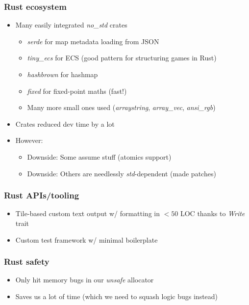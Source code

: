 \documentclass{beamer}
\begin{document}
\begin{frame}
	\frametitle{Rust ecosystem}
	\begin{itemize}
		\item Many easily integrated \emph{no\_std} crates
		      \begin{itemize}
			      \item \emph{serde} for map metadata loading from JSON
			      \item \emph{tiny\_ecs} for ECS (good pattern for structuring games in Rust)
			      \item \emph{hashbrown} for hashmap
			      \item \emph{fixed} for fixed-point maths (fast!)
			      \item Many more small ones used (\emph{arraystring}, \emph{array\_vec}, \emph{ansi\_rgb})
		      \end{itemize}
		\item Crates reduced dev time by a lot
		\item However: \begin{itemize}
			      \item Downside: Some assume stuff (atomics support)
			      \item Downside: Others are needlessly \emph{std}-dependent (made patches)
		      \end{itemize}

	\end{itemize}
\end{frame}

\begin{frame}
	\frametitle{Rust APIs/tooling}
	\begin{itemize}
		\item Tile-based custom text output w/ formatting in $<50$ LOC thanks to \emph{Write} trait
		\item Custom test framework w/ minimal boilerplate
	\end{itemize}
\end{frame}

\begin{frame}
	\frametitle{Rust safety}
	\begin{itemize}
		\item Only hit memory bugs in our \emph{unsafe} allocator
		\item Saves us a lot of time (which we need to squash logic bugs instead)
	\end{itemize}
\end{frame}
\end{document}
